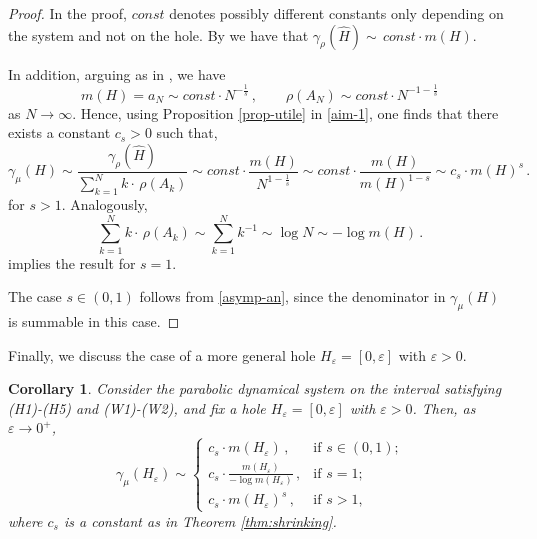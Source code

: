 \documentclass{amsart}
\newtheorem{corollary}[theorem]{Corollary}
\theoremstyle{definition}
\theoremstyle{remark}
\theoremstyle{definition}
\numberwithin{equation}{section}
\newcommand{\eps}{\varepsilon}
\begin{document}
\begin{proof}
In the proof, $const$ denotes possibly different constants only depending on the system and not on the hole. By \cite{KL} we have that $\gamma_\rho(\hat{H}) \sim\, const\cdot m(H)$.

In addition, arguing as in \cite[Lemma 10.4]{Is}, we have
\begin{equation}\label{asymp-an}
m(H) = a_N \sim const \cdot N^{-\frac 1s}\, ,\qquad \rho(A_N) \sim const \cdot N^{-1-\frac 1s}
\end{equation}
as $N\to \infty$. Hence, using Proposition \ref{prop-utile} in \eqref{aim-1}, one finds that there exists a constant $c_s > 0$ such that,
\[
\gamma_\mu(H) \sim \frac{\gamma_\rho(\hat{H})}{\sum\limits_{k=1}^{N} k \cdot \, \rho(A_k)} \sim const\cdot \frac{m(H)}{N^{1-\frac 1s}} \sim const\cdot \frac{m(H)}{m(H)^{1-s}} \sim c_s\cdot m(H)^s\, .
\]
for $s>1$. Analogously,
\[
\sum\limits_{k=1}^{N} k \cdot \, \rho(A_k) \sim \sum\limits_{k=1}^{N} k^{-1} \sim \log N \sim -\log m(H)\, .
\]
implies the result for $s=1$.

The case $s\in (0,1)$ follows from \eqref{asymp-an}, since the denominator in $\gamma_\mu(H)$ is summable in this case.
\end{proof}

Finally, we discuss the case of a more general hole $H_\eps=[0,\eps]$ with $\eps>0$. 

\begin{corollary} \label{general-hole}
Consider the parabolic dynamical system on the interval satisfying (H1)-(H5) and (W1)-(W2), and fix a hole $H_\eps=[0,\eps]$ with $\eps>0$. Then, as $\eps\to 0^+$,
\[
\gamma_\mu(H_\eps) \sim \left\{ \begin{array}{ll} c_s \cdot m(H_\eps)\, , & \text{if $s\in (0,1)$;}\\[0.2cm] c_s \cdot \frac{m(H_\eps)}{-\log m(H_\eps)}\, , & \text{if $s=1$;}\\[0.2cm] c_s \cdot m(H_\eps)^s\, , & \text{if $s>1$,} \end{array} \right.
\]
where $c_s$ is a constant as in Theorem \ref{thm:shrinking}.
\end{corollary}
\end{document}
